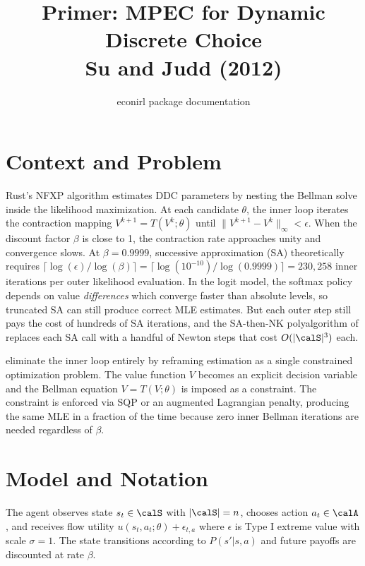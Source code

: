\documentclass[10pt]{article}
\title{Primer: MPEC for Dynamic Discrete Choice\\[3pt]
\large Su and Judd (2012)}
\author{econirl package documentation}
\date{}
\begin{document}
\maketitle
\vspace{-0.8em}

\section{Context and Problem}

Rust's NFXP algorithm \citep{rust1987} estimates DDC parameters by nesting the Bellman solve inside the likelihood maximization.
At each candidate $\theta$, the inner loop iterates the contraction mapping $V^{k+1} = T(V^k;\theta)$ until $\|V^{k+1} - V^k\|_\infty < \epsilon$.
When the discount factor $\beta$ is close to 1, the contraction rate approaches unity and convergence slows.
At $\beta = 0.9999$, successive approximation (SA) theoretically requires
$\lceil \log(\epsilon)/\log(\beta) \rceil = \lceil \log(10^{-10})/\log(0.9999) \rceil = 230{,}258$
inner iterations per outer likelihood evaluation.
In the logit model, the softmax policy depends on value \emph{differences} which converge faster than absolute levels, so truncated SA can still produce correct MLE estimates.
But each outer step still pays the cost of hundreds of SA iterations, and the SA-then-NK polyalgorithm of \citet{iskhakovRustSchjerning2016} replaces each SA call with a handful of Newton steps that cost $O(|\calS|^3)$ each.

\citet{suJudd2012} eliminate the inner loop entirely by reframing estimation as a single constrained optimization problem.
The value function $V$ becomes an explicit decision variable and the Bellman equation $V = T(V;\theta)$ is imposed as a constraint.
The constraint is enforced via SQP or an augmented Lagrangian penalty, producing the same MLE in a fraction of the time because zero inner Bellman iterations are needed regardless of $\beta$.

\section{Model and Notation}

The agent observes state $s_t \in \calS$ with $|\calS| = n$, chooses action $a_t \in \calA$, and receives flow utility $u(s_t, a_t;\theta) + \epsilon_{t,a}$ where $\epsilon$ is Type I extreme value with scale $\sigma = 1$.
The state transitions according to $P(s'|s,a)$ and future payoffs are discounted at rate $\beta$.
\end{document}
